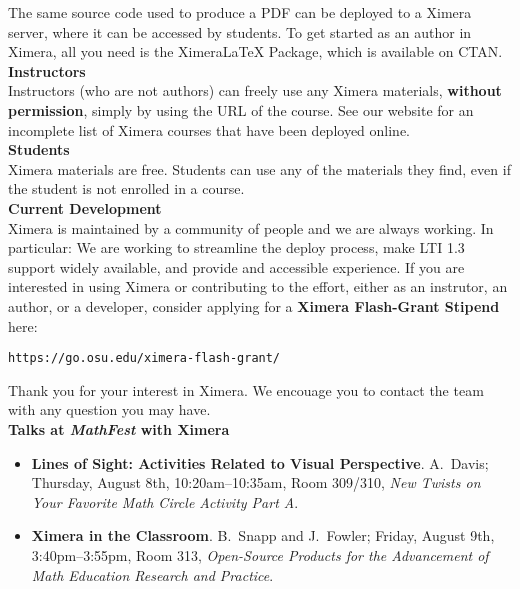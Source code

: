 \documentclass{article}
\begin{document}
\begin{multicols}{2}
\begin{center}
\begin{tikzpicture}
        \end{tikzpicture}
    \end{center}
    The same source code used to produce a PDF can be deployed to a Ximera server, where it can be accessed by students.
    To get started as an author in Ximera, all you need is the XimeraLaTeX
    Package, which is available on CTAN.
    \\[.5cm]
    {\sffamily\bfseries Instructors}\\
    Instructors (who are not authors) can freely use any Ximera materials,
    \textbf{without permission}, simply by using the URL of the
    course. See our website for an incomplete list of Ximera
    courses that have been
    deployed online.
    \\[.5cm]
    {\sffamily\bfseries Students}\\
    Ximera materials are free. Students can use any of the materials they
    find, even if the student is not enrolled in a course.
    \\[.5cm]
    {\sffamily\bfseries Current Development}\\
    Ximera is maintained by a community of people and we are always working. In
    particular: We are working to streamline the deploy process,
    make LTI 1.3 support widely available, and provide and accessible experience.
    If you are interested in using Ximera or contributing to the effort, either as an instrutor, an author, or a developer, consider
    applying for a \textbf{Ximera Flash-Grant Stipend} here:
    \begin{center}
      \tt  https://go.osu.edu/ximera-flash-grant/
    \end{center}
    Thank you for your interest in Ximera. We encouage you
    to contact the team with  any question you may have.
    \\[.5cm]
    {\sffamily\bfseries Talks at \textsl{MathFest} with Ximera}\\
    \begin{itemize}
        \item[{[1]}] \textbf{Lines of Sight: Activities Related to Visual
            Perspective}. A.\ Davis; Thursday, August 8th, 10:20am--10:35am, Room 309/310,
        \textit{New Twists on Your Favorite Math Circle Activity Part A}.
        \item[{[2]}] \textbf{Ximera in the Classroom}. B.\ Snapp and J.\ Fowler;
        Friday, August 9th, 3:40pm--3:55pm, Room 313, \textit{Open-Source Products for
            the Advancement of Math Education Research and Practice}.
    \end{itemize}

\end{multicols}
\end{document}
